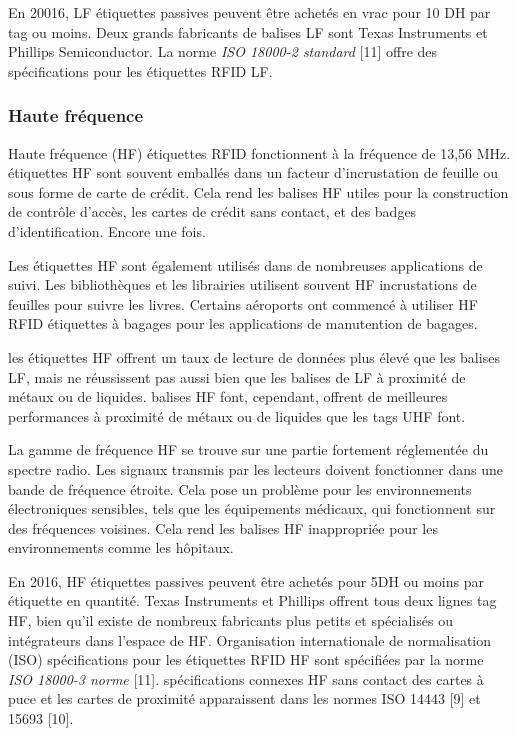 \documentclass[11pt, a4paper, twoside]{book}
\begin{document}
En 20016, LF étiquettes passives peuvent être achetés en vrac pour 10 DH par tag ou moins. Deux grands fabricants de balises LF sont Texas Instruments et Phillips Semiconductor. La norme \emph{ISO 18000-2 standard} [11] offre des spécifications pour les étiquettes RFID LF.

\subsubsection{Haute fréquence}
Haute fréquence (HF) étiquettes RFID fonctionnent à la fréquence de 13,56 MHz. étiquettes HF sont souvent emballés dans un facteur d'incrustation de feuille ou sous forme de carte de crédit. Cela rend les balises HF utiles pour la construction de contrôle d'accès, les cartes de crédit sans contact, et des badges d'identification. Encore une fois.

Les étiquettes HF sont également utilisés dans de nombreuses applications de suivi. Les bibliothèques et les librairies utilisent souvent HF incrustations de feuilles pour suivre les livres. Certains aéroports ont commencé à utiliser HF RFID étiquettes à bagages pour les applications de manutention de bagages.

les étiquettes HF offrent un taux de lecture de données plus élevé que les balises LF, mais ne réussissent pas aussi bien que les balises de LF à proximité de métaux ou de liquides. balises HF font, cependant, offrent de meilleures performances à proximité de métaux ou de liquides que les tags UHF font.

La gamme de fréquence HF se trouve sur une partie fortement réglementée du spectre radio. Les signaux transmis par les lecteurs doivent fonctionner dans une bande de fréquence étroite. Cela pose un problème pour les environnements électroniques sensibles, tels que les équipements médicaux, qui fonctionnent sur des fréquences voisines. Cela rend les balises HF inappropriée pour les environnements comme les hôpitaux.

En 2016, HF étiquettes passives peuvent être achetés pour 5DH ou moins par étiquette en quantité. Texas Instruments et Phillips offrent tous deux lignes tag HF, bien qu'il existe de nombreux fabricants plus petits et spécialisés ou intégrateurs dans l'espace de HF.
Organisation internationale de normalisation (ISO) spécifications pour les étiquettes RFID HF sont spécifiées par la norme \emph{ISO 18000-3 norme} [11]. spécifications connexes HF sans contact des cartes à puce et les cartes de proximité apparaissent dans les normes ISO 14443 [9] et 15693 [10].
\end{document}
